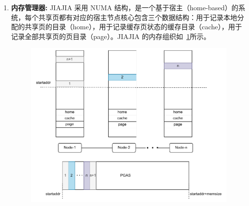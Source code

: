 {\begin{enumerate}[label=\arabic*.]
        \item \textbf{内存管理器:} JIAJIA 采用 NUMA 结构，是一个基于宿主（home-based）的系统，每个共享页都有对应的宿主节点核心包含三个数据结构：用于记录本地分配的共享页的目录（home），用于记录缓存页状态的缓存目录（cache），用于记录全部共享页的页目录（page）。JIAJIA 的内存组织如~\ref{fig:JIAJIA-memory}所示。
              \begin{figure}[!htbp]
                  \centering
                  \includegraphics[width=1.0\textwidth]{Img/JIAJIA内存组织.drawio.pdf}
                  \label{fig:JIAJIA-memory}
              \end{figure}


\end{enumerate}}
